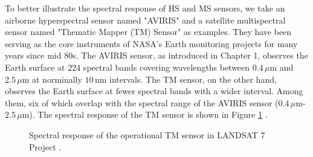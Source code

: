 To better illustrate the spectral response of HS and MS sensors, we take an
airborne hyperspectral sensor named "AVIRIS" and a satellite multispectral
sensor named "Thematic Mapper (TM) Sensor" as examples.
They have been serving as the core instruments of NASA's Earth monitoring
projects for many years since mid 80s.
The AVIRIS sensor, as introduced in Chapter 1, observes the Earth surface at
$224$ spectral bands covering wavelengths between $0.4\,\mu$m and $2.5\,\mu$m
at norminally $10\,$nm intervals.
The TM sensor, on the other hand, observes the Earth surface at fewer spectral
bands with a wider interval.
Among them, six of which overlap with the spectral range of the AVIRIS sensor
($0.4\,\mu$m-$2.5\,\mu$m).
The spectral response of the TM sensor is shown in Figure
\ref{fig:LANDSAT7_TM_RSR}
\cite{LANDSAT_SPECTRAL_RESPONSE,
      LANDSAT_HANDBOOK,
      SPECTRAL_RESPONSE_OF_LANDSAT8}.
\begin{figure}[t]
    \centering
    \caption{Spectral response of the operational TM sensor in
             LANDSAT 7 Project
             \cite{LANDSAT_SPECTRAL_RESPONSE,
                   LANDSAT_HANDBOOK,
                   SPECTRAL_RESPONSE_OF_LANDSAT8}.}
    \label{fig:LANDSAT7_TM_RSR}
\end{figure}
